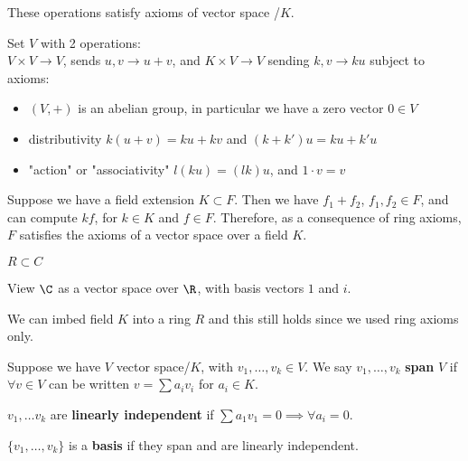 \documentclass[twoside, 10pt]{article}
\begin{document}
These operations satisfy axioms of vector space /$K$. 

Set $V$ with 2 operations: \\
$V\times V \to V$, sends $u, v \to u + v$, and $K \times V \to V$ sending $k, v \to ku$ subject to axioms:
\begin{itemize}
    \item $(V, +)$ is an abelian group, in particular we have a zero vector $0 \in V$
    \item distributivity $k(u + v) = ku + kv$ and $(k + k')u = ku + k'u$
    \item "action" or "associativity" $l(ku) = (lk)u$, and $1 \cdot v = v$
\end{itemize}

\begin{exm*}
    Suppose we have a field extension $K \subset F$. Then we have $f_1 + f_2$, $f_1, f_2 \in F$, and can compute $kf$, for $k \in K$ and $f\in F$. Therefore, as a consequence of ring axioms, $F$ satisfies the axioms of a vector space over a field $K$. 
\end{exm*}

\begin{exm*}
    $R \subset C$
\end{exm*}
View $\C$ as a vector space over $\R$, with basis vectors $1$ and $i$.

\begin{rmk}
    We can imbed field $K$ into a ring $R$ and this still holds since we used ring axioms only.
\end{rmk}

\begin{defn}
    Suppose we have $V$ vector space/$K$, with $v_1, \ldots, v_k \in V$. We say $v_1, \ldots, v_k$ \textbf{span} $V$ if $\forall v \in V$ can be written $v = \sum a_iv_i$ for $a_i \in K$.
\end{defn}

\begin{defn}
    $v_1, \ldots v_k$ are \textbf{linearly independent} if $\sum a_1 v_1 = 0 \implies \forall a_i = 0$.
\end{defn}

\begin{defn}
    $\{v_1, \ldots, v_k\}$ is a \textbf{basis} if they span and are linearly independent.
\end{defn}
\end{document}

